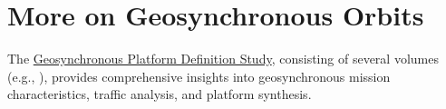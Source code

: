 % 

\section{More on Geosynchronous Orbits}
The \href{https://ntrs.nasa.gov/search?q=Geosynchronous\%20platform\%20definition\%20study&page=\%7B\%22from\%22:0,\%22size\%22:25\%7D}{Geosynchronous Platform Definition Study}, consisting of several volumes 
(e.g., \cite[Executive Summary]{Myers1973_ExecSummary,
Myers1973_StudySummary,
Myers1973,
Myers1973_TrafficBaseline,
Myers1973_PlatformSynthesis
Myers1973_TransportationRequirements}), provides comprehensive insights into geosynchronous mission characteristics, traffic analysis, and platform synthesis.\

\endinput  %
